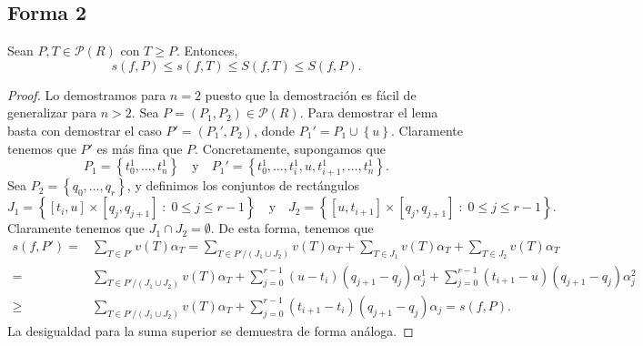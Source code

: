 \subsection*{Forma 2}

\begin{lema}
Sean $\displaystyle P,T \in \mathcal{P}\left(R\right) $ con $\displaystyle T \geq P $. Entonces,
\[s\left(f,P\right)\leq s\left(f,T\right)\leq S\left(f,T\right)\leq S\left(f,P\right) .\]
\end{lema}
\begin{proof}
	Lo demostramos para $\displaystyle n =2$ puesto que la demostración es fácil de generalizar para $\displaystyle n > 2 $. Sea $\displaystyle P = \left(P_{1},P_{2}\right) \in \mathcal{P}\left(R\right) $. Para demostrar el lema basta con demostrar el caso $\displaystyle P' = \left(P_{1}',P_{2}\right) $, donde $\displaystyle P_{1}' = P_{1} \cup \left\{ u\right\}  $. Claramente tenemos que $\displaystyle P' $ es más fina que $\displaystyle P $. Concretamente, supongamos que 
\[P_{1} = \left\{ t_{0}^{1}, \ldots, t_{n}^{1}\right\} \quad \text{y} \quad P_{1}' = \left\{ t_{0}^{1}, \ldots, t_{i}^{1}, u, t_{i+1}^{1}, \ldots, t_{n}^{1}\right\}  .\]
Sea $\displaystyle P_{2} = \left\{ q_{0}, \ldots, q_{r}\right\}  $, y definimos los conjuntos de rectángulos
\[J_{1} = \left\{ [t_{i}, u] \times [q_{j}, q_{j+1}] \; : \; 0 \leq j \leq r-1 \right\} \quad \text{y} \quad  J_{2} = \left\{ \left[u, t_{i+1}\right] \times \left[q_{j}, q_{j+1}\right] \; : \; 0 \leq j \leq r-1\right\} .\]
Claramente tenemos que $\displaystyle J_{1} \cap J_{2} = \emptyset $. De esta forma, tenemos que
\[
\begin{split}
	s\left(f,P'\right) = &  \sum_{T \in P'}v\left(T\right) \alpha_{T} 
	=  \sum_{T \in P'/\left(J_{1} \cup J_{2}\right)}v\left(T\right) \alpha_{T} + \sum_{T \in J_{1}}v\left(T\right) \alpha_{T} + \sum_{T \in J_{2}}v\left(T\right) \alpha_{T} \\
	= & \sum_{T \in P'/\left(J_{1} \cup J_{2}\right)}v\left(T\right) \alpha_{T} + \sum^{r-1}_{j = 0}\left(u-t_{i}\right)\left(q_{j+1}-q_{j}\right)\alpha_{j}^{1}+\sum^{r-1}_{j = 0}\left(t_{i+1}-u\right)\left(q_{j+1}-q_{j}\right)\alpha_{j}^{2}\\
	\geq & \sum_{T \in P'/\left(J_{1} \cup J_{2}\right)}v\left(T\right) \alpha_{T} + \sum^{r-1}_{j = 0} \left(t_{i+1}-t_{i}\right)\left(q_{j+1}-q_{j}\right)\alpha_{j} = s\left(f,P\right).
\end{split}
\]
La desigualdad para la suma superior se demuestra de forma análoga. 
\end{proof}

